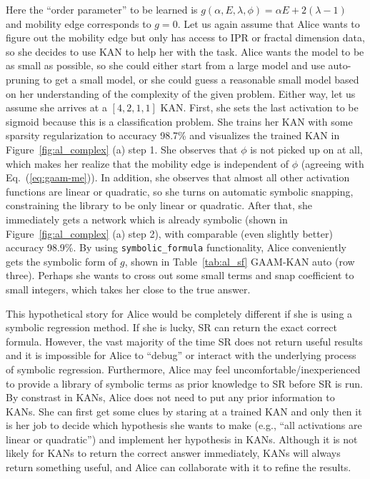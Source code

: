 \documentclass{article}
\numberwithin{equation}{section}
\numberwithin{figure}{section}
\begin{document}
Here the ``order parameter'' to be learned is $g(\alpha,E,\lambda,\phi)=\alpha E+2(\lambda -1)$ and mobility edge corresponds to $g=0$. Let us again assume that Alice wants to figure out the mobility edge but only has access to IPR or fractal dimension data, so she decides to use KAN to help her with the task. Alice wants the model to be as small as possible, so she could either start from a large model and use auto-pruning to get a small model, or she could guess a reasonable small model based on her understanding of the complexity of the given problem. Either way, let us assume she arrives at a $[4,2,1,1]$ KAN. First, she sets the last activation to be sigmoid because this is a classification problem. She trains her KAN with some sparsity regularization to accuracy 98.7\% and visualizes the trained KAN in Figure~\ref{fig:al_complex} (a) step 1. She observes that $\phi$ is not picked up on at all, which makes her realize that the mobility edge is independent of $\phi$ (agreeing with Eq.~(\ref{eq:gaam-me})). In addition, she observes that almost all other activation functions are linear or quadratic, so she turns on automatic symbolic snapping, constraining the library to be only linear or quadratic. After that, she immediately gets a network which is already symbolic (shown in Figure~\ref{fig:al_complex} (a) step 2), with comparable (even slightly better) accuracy 98.9\%. By using \texttt{symbolic\_formula} functionality, Alice conveniently gets the symbolic form of $g$, shown in Table~\ref{tab:al_sf} GAAM-KAN auto (row three). Perhaps she wants to cross out some small terms and snap coefficient to small integers, which takes her close to the true answer.

This hypothetical story for Alice would be completely different if she is using a symbolic regression method. If she is lucky, SR can return the exact correct formula. However, the vast majority of the time SR does not return useful results and it is impossible for Alice to ``debug'' or interact with the underlying process of symbolic regression. Furthermore, Alice may feel uncomfortable/inexperienced to provide a library of symbolic terms as prior knowledge to SR before SR is run. By constrast in KANs, Alice does not need to put any prior information to KANs. She can first get some  clues by staring at a trained KAN and only then it is her job to decide which hypothesis she wants to make (e.g., ``all activations are linear or quadratic'') and implement her hypothesis in KANs. Although it is not likely for KANs to return the correct answer immediately, KANs will always return something useful, and Alice can collaborate with it to refine the results. 
\end{document}
